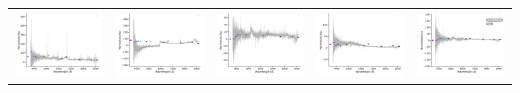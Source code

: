 \begin{center}
\begin{longtable}{l l l l l }
    \includegraphics[width=0.19\linewidth, clip]{Figs/Figs-lamost/spec-56012-F5601204_sp14-071-SPLUS-n01s19-035613.pdf} & \includegraphics[width=0.19\linewidth, clip]{Figs/Figs-lamost/spec-56218-EG034047S021957B01_sp12-127-STRIPE82-0081-034915.pdf} & \includegraphics[width=0.19\linewidth, clip]{Figs/Figs-lamost/spec-56218-EG213945N020821B01_sp02-208-STRIPE82-0120-007072.pdf} & \includegraphics[width=0.19\linewidth, clip]{Figs/Figs-lamost/spec-56218-EG213945N020821B01_sp10-219-STRIPE82-0120-045064.pdf} & \includegraphics[width=0.19\linewidth, clip]{Figs/Figs-lamost/spec-56218-EG213945N020821M01_sp02-208-STRIPE82-0120-007072.pdf} \\

\end{longtable}
\end{center}
